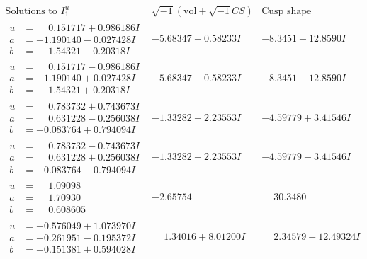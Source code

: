 \documentclass[1p]{elsarticle_modified}
\theoremstyle{definition}
\newcommand{\I}{\sqrt{-1}}
\begin{document}
$$\begin{array}{c|c|c}  
\text{Solutions to }I^u_{1}& \I (\text{vol} + \sqrt{-1}CS) & \text{Cusp shape}\\
 \hline 
\begin{aligned}
u &= \phantom{-}0.151717 + 0.986186 I \\
a &= -1.190140 - 0.027428 I \\
b &= \phantom{-}1.54321 - 0.20318 I\end{aligned}
 & -5.68347 - 0.58233 I & -8.3451 + 12.8590 I \\ \hline\begin{aligned}
u &= \phantom{-}0.151717 - 0.986186 I \\
a &= -1.190140 + 0.027428 I \\
b &= \phantom{-}1.54321 + 0.20318 I\end{aligned}
 & -5.68347 + 0.58233 I & -8.3451 - 12.8590 I \\ \hline\begin{aligned}
u &= \phantom{-}0.783732 + 0.743673 I \\
a &= \phantom{-}0.631228 - 0.256038 I \\
b &= -0.083764 + 0.794094 I\end{aligned}
 & -1.33282 - 2.23553 I & -4.59779 + 3.41546 I \\ \hline\begin{aligned}
u &= \phantom{-}0.783732 - 0.743673 I \\
a &= \phantom{-}0.631228 + 0.256038 I \\
b &= -0.083764 - 0.794094 I\end{aligned}
 & -1.33282 + 2.23553 I & -4.59779 - 3.41546 I \\ \hline\begin{aligned}
u &= \phantom{-}1.09098\phantom{ +0.000000I} \\
a &= \phantom{-}1.70930\phantom{ +0.000000I} \\
b &= \phantom{-}0.608605\phantom{ +0.000000I}\end{aligned}
 & -2.65754\phantom{ +0.000000I} & \phantom{-}30.3480\phantom{ +0.000000I} \\ \hline\begin{aligned}
u &= -0.576049 + 1.073970 I \\
a &= -0.261951 - 0.195372 I \\
b &= -0.151381 + 0.594028 I\end{aligned}
 & \phantom{-}1.34016 + 8.01200 I & \phantom{-}2.34579 - 12.49324 I \\ \hline\begin{aligned}

\end{aligned}
\end{array}$$
\end{document}
